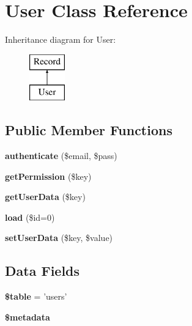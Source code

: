 \hypertarget{class_user}{\section{User Class Reference}
\label{class_user}
}
Inheritance diagram for User\-:\begin{figure}[H]
\begin{center}
\leavevmode
\includegraphics[height=2.000000cm]{class_user}
\end{center}
\end{figure}
\subsection*{Public Member Functions}
\begin{DoxyCompactItemize}
\item 
\hypertarget{class_user_a1e96415be573b36d4160d6ed1f6f40d3}{{\bfseries authenticate} (\$email, \$pass)}\label{class_user_a1e96415be573b36d4160d6ed1f6f40d3}

\item 
\hypertarget{class_user_a610dd05d53d99e1ddc05596468eb4914}{{\bfseries get\-Permission} (\$key)}\label{class_user_a610dd05d53d99e1ddc05596468eb4914}

\item 
\hypertarget{class_user_ab62d4b3c3a14ab592768235dad6deb63}{{\bfseries get\-User\-Data} (\$key)}\label{class_user_ab62d4b3c3a14ab592768235dad6deb63}

\item 
\hypertarget{class_user_a7160b09d9d37ede69811a66dc9e4f272}{{\bfseries load} (\$id=0)}\label{class_user_a7160b09d9d37ede69811a66dc9e4f272}

\item 
\hypertarget{class_user_a96f600de7f4fe416bf8565d9d0eebee4}{{\bfseries set\-User\-Data} (\$key, \$value)}\label{class_user_a96f600de7f4fe416bf8565d9d0eebee4}

\end{DoxyCompactItemize}
\subsection*{Data Fields}
\begin{DoxyCompactItemize}
\item 
\hypertarget{class_user_ae8876a14058f368335baccf35af4a22b}{{\bfseries \$table} = 'users'}\label{class_user_ae8876a14058f368335baccf35af4a22b}

\item 
\hypertarget{class_user_ae7fc3682b173ad9d4b1892bdc04d18d9}{{\bfseries \$metadata}}\label{class_user_ae7fc3682b173ad9d4b1892bdc04d18d9}

\end{DoxyCompactItemize}
